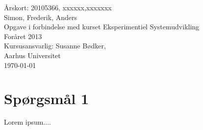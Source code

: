 \documentclass[12pt,a4paper,twoside,danish,article]{memoir}
\begin{document}
\frontmatter
\begin{titlingpage}
  \begin{center}
    \mbox{}\vfill
    \vspace{3cm}
    \Large{Årskort: 20105366, xxxxxx,xxxxxxx}\\
    \Large{Simon, Frederik, Anders}\\
    \vspace{10cm}
    Opgave i forbindelse med kurset Eksperimentiel Systemudvikling\\
    Foråret 2013\\
    \vspace{1cm}
    Kursusansvarlig: Susanne Bødker,\\Aarhus Universitet\\
    \today
  \end{center}
  \clearpage
  \tableofcontents*
\end{titlingpage}

\mainmatter

\renewcommand{\baselinestretch}{1.6}\normalsize %

\renewcommand{\chaptermark}[1]{\markboth{\thechapter.
    #1}{\thechapter. #1}} %
\renewcommand{\bibmark}{\markboth{\bibname}{\bibname}} %
\renewcommand{\tocmark}{\markboth{\contentsname}{\contentsname}}


\chapter{Spørgsmål 1}
Lorem ipsum....
\end{document}
